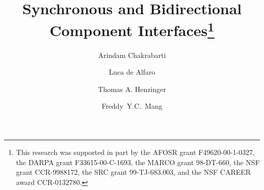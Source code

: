 \documentclass{llncs}
\begin{document}

\title{Synchronous and Bidirectional Component Interfaces\thanks{
  This research was supported in part by 
  the AFOSR grant F49620-00-1-0327, 
  the DARPA grant F33615-00-C-1693, 
  the MARCO grant 98-DT-660, 
  the NSF grant CCR-9988172,
  the SRC grant 99-TJ-683.003, and 
  the NSF CAREER award CCR-0132780. %
}}
\author{
Arindam Chakrabarti \and Luca de Alfaro \and 
Thomas A. Henzinger \and \mbox{Freddy Y.C. Mang}
}
\date{}
\maketitle 




 


% 



\end{document}
